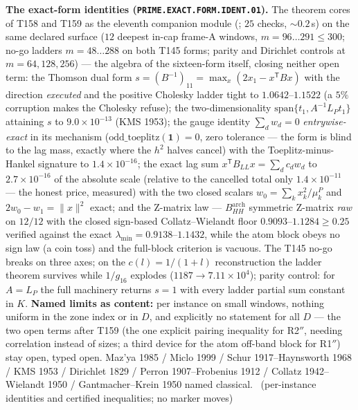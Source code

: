 \documentclass[11pt,a4paper]{article}
\theoremstyle{definition}
\begin{document}
\par\smallskip\noindent\textbf{The exact-form identities
(\texttt{PRIME.EXACT.FORM.IDENT.01}).}
The theorem cores of T158 and T159 as the eleventh companion module
(; $25$ checks, ${\sim}0.2$\,s)
on the same declared surface ($12$ deepest in-cap frame-A windows,
$m=96\ldots291\le300$; no-go ladders $m=48\ldots288$ on both T145 forms;
parity and Dirichlet controls at $m=64,128,256$) --- the algebra of the
sixteen-form itself, closing neither open term: the Thomson dual form
$s=(B^{-1})_{11}=\max_x(2x_1-x^{\mathsf T}Bx)$ with the direction
\emph{executed} and the positive Cholesky ladder tight to
$1.0642$--$1.1522$ (a $5\%$ corruption makes the Cholesky refuse); the
two-dimensionality $\mathrm{span}\{t_1,A^{-1}L_Pt_1\}$ attaining $s$ to
$9.0\times10^{-13}$ (KMS 1953); the gauge identity $\sum_dw_d=0$
\emph{entrywise-exact} in its mechanism ($\mathrm{odd\_toeplitz}
(\mathbf 1)=0$, zero tolerance --- the form is blind to the lag mass,
exactly where the $h^2$ halves cancel) with the Toeplitz-minus-Hankel
signature to $1.4\times10^{-16}$; the exact lag sum
$x^{\mathsf T}B_{LL}x=\sum_dc_dw_d$ to $2.7\times10^{-16}$ of the
absolute scale (relative to the cancelled total only
$1.4\times10^{-11}$ --- the honest price, measured) with the two closed
scalars $w_0=\sum_kx_k^2/\mu^P_k$ and $2w_0-w_1=\|x\|^2$ exact; and the
Z-matrix law --- $B^{\mathrm{arch}}_{HH}$ symmetric Z-matrix \emph{raw}
on $12/12$ with the closed sign-based Collatz--Wielandt floor
$0.9093$--$1.1284\ge0.25$ verified against the exact
$\lambda_{\min}=0.9138$--$1.1432$, while the atom block obeys no sign
law (a coin toss) and the full-block criterion is vacuous. The T145
no-go breaks on three axes; on the $c(l)=1/(1+l)$ reconstruction the
ladder theorem survives while $1/g_{16}$ explodes
($1187\to7.11\times10^{4}$); parity control: for $A=L_P$ the full
machinery returns $s=1$ with every ladder partial sum constant in $K$.
\textbf{Named limits as content:} per instance on small windows, nothing
uniform in the zone index or in $D$, and explicitly no statement for all
$D$ --- the two open terms after T159 (the one explicit pairing
inequality for R2$''$, needing correlation instead of sizes; a third
device for the atom off-band block for R1$''$) stay open, typed open.
Maz'ya 1985 / Miclo 1999 / Schur 1917--Haynsworth 1968 / KMS 1953 /
Dirichlet 1829 / Perron 1907--Frobenius 1912 / Collatz 1942--Wielandt
1950 / Gantmacher--Krein 1950 named classical.
\mE\ (per-instance identities and certified inequalities; no marker moves)
\par\smallskip
\end{document}
